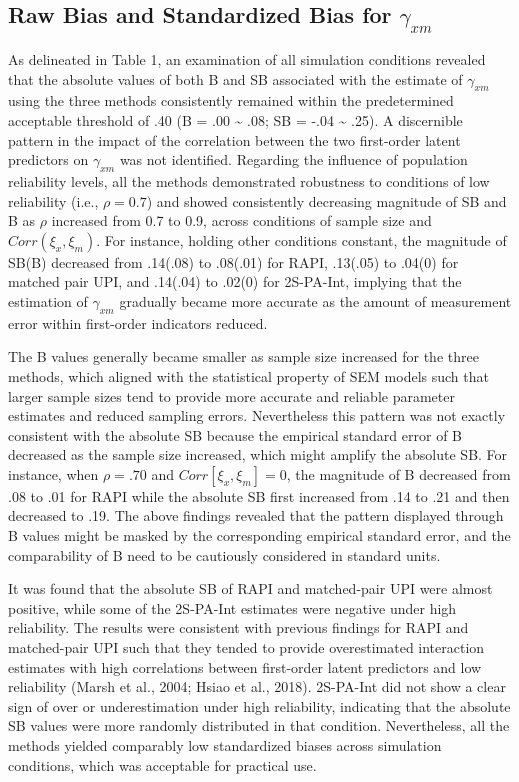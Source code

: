 \documentclass[
  man]{apa6}
\begin{document}
\subsection{\texorpdfstring{Raw Bias and Standardized Bias for \(\gamma_{xm}\)}{Raw Bias and Standardized Bias for \textbackslash gamma\_\{xm\}}}\label{raw-bias-and-standardized-bias-for-gamma_xm}

As delineated in Table 1, an examination of all simulation conditions revealed that the absolute values of both B and SB associated with the estimate of \(\gamma_{xm}\) using the three methods consistently remained within the predetermined acceptable threshold of .40 (B = .00 \textasciitilde{} .08; SB = -.04 \textasciitilde{} .25). A discernible pattern in the impact of the correlation between the two first-order latent predictors on \(\gamma_{xm}\) was not identified. Regarding the influence of population reliability levels, all the methods demonstrated robustness to conditions of low reliability (i.e., \(\rho = 0.7\)) and showed consistently decreasing magnitude of SB and B as \(\rho\) increased from 0.7 to 0.9, across conditions of sample size and \(Corr(\xi_{x}, \xi_{m})\). For instance, holding other conditions constant, the magnitude of SB(B) decreased from .14(.08) to .08(.01) for RAPI, .13(.05) to .04(0) for matched pair UPI, and .14(.04) to .02(0) for 2S-PA-Int, implying that the estimation of \(\gamma_{xm}\) gradually became more accurate as the amount of measurement error within first-order indicators reduced.

The B values generally became smaller as sample size increased for the three methods, which aligned with the statistical property of SEM models such that larger sample sizes tend to provide more accurate and reliable parameter estimates and reduced sampling errors. Nevertheless this pattern was not exactly consistent with the absolute SB because the empirical standard error of B decreased as the sample size increased, which might amplify the absolute SB. For instance, when \(\rho = .70\) and \(Corr[\xi_{x}, \xi_{m}] = 0\), the magnitude of B decreased from .08 to .01 for RAPI while the absolute SB first increased from .14 to .21 and then decreased to .19. The above findings revealed that the pattern displayed through B values might be masked by the corresponding empirical standard error, and the comparability of B need to be cautiously considered in standard units.

It was found that the absolute SB of RAPI and matched-pair UPI were almost positive, while some of the 2S-PA-Int estimates were negative under high reliability. The results were consistent with previous findings for RAPI and matched-pair UPI such that they tended to provide overestimated interaction estimates with high correlations between first-order latent predictors and low reliability (Marsh et al., 2004; Hsiao et al., 2018). 2S-PA-Int did not show a clear sign of over or underestimation under high reliability, indicating that the absolute SB values were more randomly distributed in that condition. Nevertheless, all the methods yielded comparably low standardized biases across simulation conditions, which was acceptable for practical use.
\end{document}
